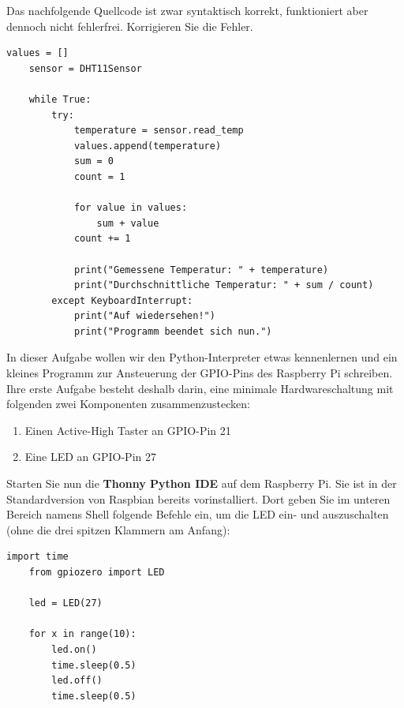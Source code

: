 \teilaufgabe
Das nachfolgende Quellcode ist zwar syntaktisch korrekt, funktioniert aber
dennoch nicht fehlerfrei. Korrigieren Sie die Fehler.

\begin{Verbatim}[gobble=4]
    values = []
    sensor = DHT11Sensor

    while True:
        try:
            temperature = sensor.read_temp
            values.append(temperature)
            sum = 0
            count = 1

            for value in values:
                sum + value
            count += 1

            print("Gemessene Temperatur: " + temperature)
            print("Durchschnittliche Temperatur: " + sum / count)
        except KeyboardInterrupt:
            print("Auf wiedersehen!")
            print("Programm beendet sich nun.")
\end{Verbatim}

\teilaufgabe
In dieser Aufgabe wollen wir den Python-Interpreter etwas kennenlernen und ein
kleines Programm zur Ansteuerung der GPIO-Pins des Raspberry Pi schreiben.
Ihre erste Aufgabe besteht deshalb darin, eine minimale Hardwareschaltung mit
folgenden zwei Komponenten zusammenzustecken:

\begin{enumerate}
    \item Einen Active-High Taster an GPIO-Pin 21
    \item Eine LED an GPIO-Pin 27
\end{enumerate}

\teilaufgabe
Starten Sie nun die \textbf{Thonny Python IDE} auf dem Raspberry Pi. Sie ist
in der Standardversion von Raspbian bereits vorinstalliert. Dort geben Sie im
unteren Bereich namens \glqq{}Shell\grqq{} folgende Befehle ein, um die LED ein-
und auszuschalten (ohne die drei spitzen Klammern am Anfang):

\begin{Verbatim}[gobble=4]
    import time
    from gpiozero import LED

    led = LED(27)

    for x in range(10):
        led.on()
        time.sleep(0.5)
        led.off()
        time.sleep(0.5)
\end{Verbatim}

